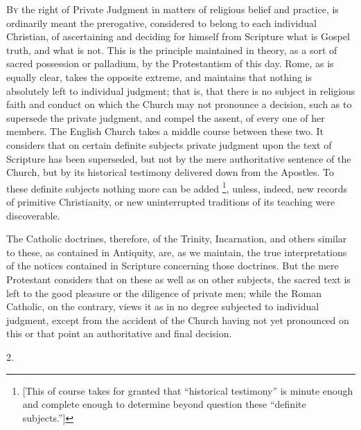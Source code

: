 B\textsc{y} the right of Private Judgment in
matters of religious belief and practice, is ordinarily meant the
prerogative, considered to belong to each individual Christian, of
ascertaining and deciding for himself from Scripture what is Gospel
truth, and what is not. This is the principle maintained in theory, as
a sort of sacred possession or palladium, by the Protestantism of this
day. Rome, as is equally clear, takes the opposite extreme, and
maintains that nothing is absolutely left to individual judgment; that
is, that there is no subject in religious faith and conduct on which
the Church may not pronounce a decision, such as to supersede the
private judgment, and compel the assent, of every one of her members.
The English Church takes a middle course between these two. It
considers that on certain definite subjects private judgment upon the
text of Scripture has been superseded, but not by the mere
authoritative sentence of the Church, but by its historical testimony
delivered down from the Apostles. To these definite subjects nothing
more can be added \footnote{[This of course takes for granted that ``historical
testimony'' is minute enough and complete enough to determine
beyond question these ``definite subjects.'']},
unless, indeed, new records of primitive Christianity, or new
uninterrupted traditions of its teaching were discoverable.

The Catholic doctrines, therefore, of the Trinity, Incarnation,
and others similar to these, as contained in Antiquity, are, as
we maintain, the true interpretations of the notices contained in
Scripture concerning those doctrines. But the mere Protestant
considers that on these as well as on other subjects, the sacred text
is left to the good pleasure or the diligence of private men; while
the Roman Catholic, on the contrary, views it as in no degree
subjected to individual judgment, except from the accident of the
Church having not yet pronounced on this or that point an
authoritative and final decision.

2.

